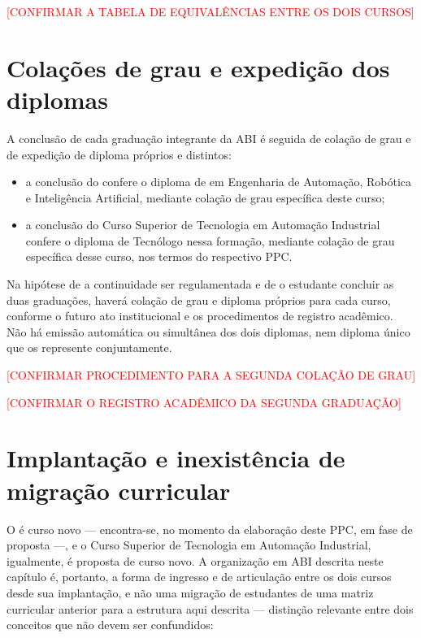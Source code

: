 \textcolor{red}{[CONFIRMAR A TABELA DE EQUIVALÊNCIAS ENTRE OS DOIS CURSOS]}

\section{Colações de grau e expedição dos diplomas}
\label{sec:diplomas}

A conclusão de cada graduação integrante da ABI é seguida de colação de grau e de expedição de diploma próprios e distintos:

\begin{itemize}
    \item a conclusão do \ppccurso confere o diploma de \ppcgrau em Engenharia de Automação, Robótica e Inteligência Artificial, mediante colação de grau específica deste curso;
    \item a conclusão do Curso Superior de Tecnologia em Automação Industrial confere o diploma de Tecnólogo nessa formação, mediante colação de grau específica desse curso, nos termos do respectivo PPC.
\end{itemize}

Na hipótese de a continuidade ser regulamentada e de o estudante concluir as duas graduações, haverá colação de grau e diploma próprios para cada curso, conforme o futuro ato institucional e os procedimentos de registro acadêmico. Não há emissão automática ou simultânea dos dois diplomas, nem diploma único que os represente conjuntamente.

\textcolor{red}{[CONFIRMAR PROCEDIMENTO PARA A SEGUNDA COLAÇÃO DE GRAU]}

\textcolor{red}{[CONFIRMAR O REGISTRO ACADÊMICO DA SEGUNDA GRADUAÇÃO]}

\section{Implantação e inexistência de migração curricular}
\label{sec:migracao_curricular}

O \ppccurso é curso novo — encontra-se, no momento da elaboração deste PPC, em fase de proposta —, e o Curso Superior de Tecnologia em Automação Industrial, igualmente, é proposta de curso novo. A organização em ABI descrita neste capítulo é, portanto, a forma de ingresso e de articulação entre os dois cursos desde sua implantação, e não uma migração de estudantes de uma matriz curricular anterior para a estrutura aqui descrita — distinção relevante entre dois conceitos que não devem ser confundidos:

